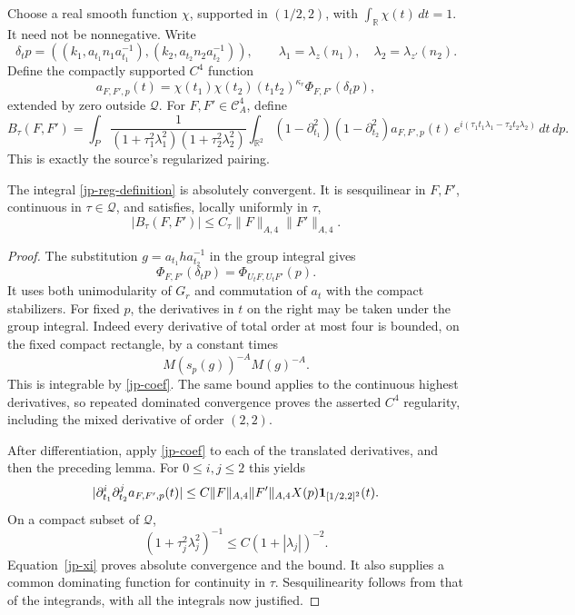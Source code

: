 Choose a real smooth function \(\chi\), supported in
\((1/2,2)\), with \(\int_{\mathbb R}\chi(t)\,dt=1\).
It need not be nonnegative.  Write
\[
 \delta_t p=((k_1,a_{t_1}n_1a_{t_1}^{-1}),
             (k_2,a_{t_2}n_2a_{t_2}^{-1})),\qquad
 \lambda_1=\lambda_z(n_1),\quad\lambda_2=\lambda_{z'}(n_2).
\]
Define the compactly supported \(C^4\) function
\[
 a_{F,F',p}(t)=
       \chi(t_1)\chi(t_2)(t_1t_2)^{\kappa_r}
                                  \Phi_{F,F'}(\delta_t p),
\]
extended by zero outside \(\mathcal Q\).
For \(F,F'\in\mathcal C_A^4\), define
\begin{equation}\label{jp-reg-definition}
 B_\tau(F,F')
 =\int_P\frac{1}{(1+\tau_1^2\lambda_1^2)
                    (1+\tau_2^2\lambda_2^2)}
    \int_{\mathbb R^2}
      (1-\partial_{t_1}^2)(1-\partial_{t_2}^2)
          a_{F,F',p}(t)\,
      e^{i(\tau_1t_1\lambda_1-\tau_2t_2\lambda_2)}\,dt\,dp .
\end{equation}
This is exactly the source's regularized pairing.

\begin{proposition}\label{jp-reg-bound}
The integral \eqref{jp-reg-definition} is absolutely convergent.
It is sesquilinear in \(F,F'\), continuous in \(\tau\in\mathcal Q\),
and satisfies, locally uniformly in \(\tau\),
\begin{equation}\label{jp-Bbound}
       |B_\tau(F,F')|\leq C_\tau\|F\|_{A,4}\|F'\|_{A,4}.
\end{equation}
\end{proposition}

\begin{proof}
The substitution \(g=a_{t_1}h a_{t_2}^{-1}\) in the group
integral gives
\begin{equation}\label{jp-phase-translate}
 \Phi_{F,F'}(\delta_t p)
                  =\Phi_{U_tF,U_tF'}(p).
\end{equation}
It uses both unimodularity of \(G_r\) and commutation of
\(a_t\) with the compact stabilizers.
For fixed \(p\), the derivatives in \(t\) on the right may
be taken under the group integral.  Indeed every derivative
of total order at most four is bounded, on the fixed compact
rectangle, by a constant times
\[
                 M(s_p(g))^{-A}M(g)^{-A}.
\]
This is integrable by \eqref{jp-coef}.
The same bound applies to the continuous highest derivatives,
so repeated dominated convergence proves the asserted \(C^4\)
regularity, including the mixed derivative of order \((2,2)\).

After differentiation, apply \eqref{jp-coef} to each of the
translated derivatives, and then the preceding lemma.
For \(0\leq i,j\leq2\) this yields
\[
 |\partial_{t_1}^i\partial_{t_2}^j a_{F,F',p}(t)|
 \leq C\|F\|_{A,4}\|F'\|_{A,4}X(p)
                      {\bf1}_{[1/2,2]^2}(t).
\]
On a compact subset of \(\mathcal Q\),
\[
 (1+\tau_j^2\lambda_j^2)^{-1}
                         \leq C(1+|\lambda_j|)^{-2}.
\]
Equation~\eqref{jp-xi} proves absolute convergence and the
bound.  It also supplies a common dominating function for
continuity in \(\tau\).  Sesquilinearity follows from that
of the integrands, with all the integrals now justified.
\end{proof}

